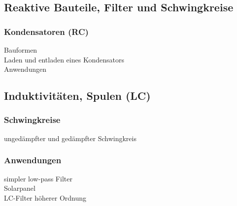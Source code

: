 \subsection{Reaktive Bauteile, Filter und Schwingkreise}

\subsubsection{Kondensatoren (RC)}
Bauformen\\
Laden und entladen eines Kondensators\\
Anwendungen

\subsection{Induktivitäten, Spulen (LC)}

\subsubsection{Schwingkreise}
ungedämpfter und gedämpfter Schwingkreis

\subsubsection{Anwendungen}
simpler low-pass Filter\\
Solarpanel\\
LC-Filter höherer Ordnung